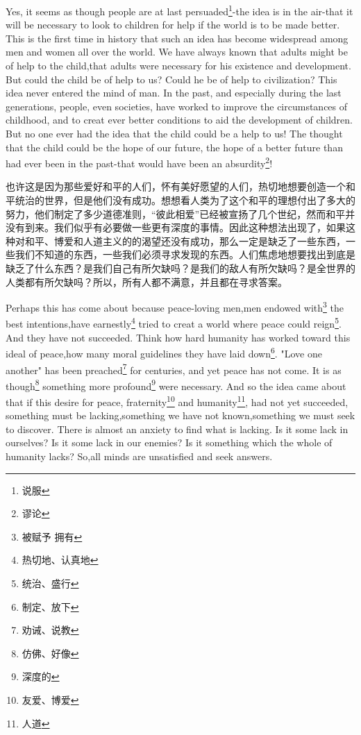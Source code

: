 \documentclass[lang=cn,10pt]{elegantbook}
\begin{document}
Yes, it seems as though people are at last persuaded\footnote{说服}-the idea is in the air-that it will be necessary to look to children for help if the world is to be made better. This is the first time in history that such an idea has become widespread among men and women all over the world. We have always known that adults might be of help to the child,that adults were necessary for his existence and development. But could the child be of help to us? Could he be of help to civilization? This idea never entered the mind of man. In the past, and especially during the last generations, people, even societies, have worked to improve the circumstances of childhood, and to creat ever better conditions to aid the development of children. But no one ever had the idea that the child could be a help to us! The thought that the child could be the hope of our future, the hope of a better future than had ever been in the past-that would have been an absurdity\footnote{谬论}!

也许这是因为那些爱好和平的人们，怀有美好愿望的人们，热切地想要创造一个和平统治的世界，但是他们没有成功。想想看人类为了这个和平的理想付出了多大的努力，他们制定了多少道德准则，“彼此相爱”已经被宣扬了几个世纪，然而和平并没有到来。我们似乎有必要做一些更有深度的事情。因此这种想法出现了，如果这种对和平、博爱和人道主义的的渴望还没有成功，那么一定是缺乏了一些东西，一些我们不知道的东西，一些我们必须寻求发现的东西。人们焦虑地想要找出到底是缺乏了什么东西？是我们自己有所欠缺吗？是我们的敌人有所欠缺吗？是全世界的人类都有所欠缺吗？所以，所有人都不满意，并且都在寻求答案。

Perhaps this has come about because peace-loving men,men endowed with\footnote{被赋予 拥有} the best intentions,have earnestly\footnote{热切地、认真地} tried to creat a world where peace could reign\footnote{统治、盛行}. And they have not succeeded. Think how hard humanity has worked toward this ideal of peace,how many moral guidelines they have laid down\footnote{制定、放下}. "Love one another" has been preached\footnote{劝诫、说教} for centuries, and yet peace has not come. It is as though\footnote{仿佛、好像} something more profound\footnote{深度的} were necessary. And so the idea came about that if this desire for peace, fraternity\footnote{友爱、博爱} and humanity\footnote{人道}, had not yet succeeded, something must be lacking,something we have not known,something we must seek to discover. There is almost an anxiety to find what is lacking. Is it some lack in ourselves? Is it some lack in our enemies? Is it something which the whole of humanity lacks? So,all minds are unsatisfied and seek answers.
\end{document}
